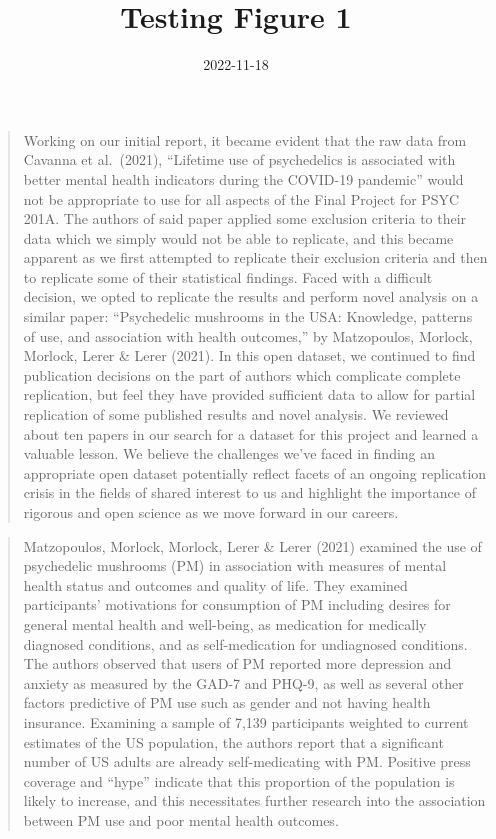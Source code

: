 \documentclass[
]{article}
\title{Testing Figure 1}
\author{}
\date{\vspace{-2.5em}2022-11-18}
\begin{document}
\maketitle

\begin{quote}
Working on our initial report, it became evident that the raw data from
Cavanna et al.~(2021), ``Lifetime use of psychedelics is associated with
better mental health indicators during the COVID-19 pandemic'' would not
be appropriate to use for all aspects of the Final Project for PSYC
201A. The authors of said paper applied some exclusion criteria to their
data which we simply would not be able to replicate, and this became
apparent as we first attempted to replicate their exclusion criteria and
then to replicate some of their statistical findings. Faced with a
difficult decision, we opted to replicate the results and perform novel
analysis on a similar paper: ``Psychedelic mushrooms in the USA:
Knowledge, patterns of use, and association with health outcomes,'' by
Matzopoulos, Morlock, Morlock, Lerer \& Lerer (2021). In this open
dataset, we continued to find publication decisions on the part of
authors which complicate complete replication, but feel they have
provided sufficient data to allow for partial replication of some
published results and novel analysis. We reviewed about ten papers in
our search for a dataset for this project and learned a valuable lesson.
We believe the challenges we've faced in finding an appropriate open
dataset potentially reflect facets of an ongoing replication crisis in
the fields of shared interest to us and highlight the importance of
rigorous and open science as we move forward in our careers.
\end{quote}

\begin{quote}
Matzopoulos, Morlock, Morlock, Lerer \& Lerer (2021) examined the use of
psychedelic mushrooms (PM) in association with measures of mental health
status and outcomes and quality of life. They examined participants'
motivations for consumption of PM including desires for general mental
health and well-being, as medication for medically diagnosed conditions,
and as self-medication for undiagnosed conditions. The authors observed
that users of PM reported more depression and anxiety as measured by the
GAD-7 and PHQ-9, as well as several other factors predictive of PM use
such as gender and not having health insurance. Examining a sample of
7,139 participants weighted to current estimates of the US population,
the authors report that a significant number of US adults are already
self-medicating with PM. Positive press coverage and ``hype'' indicate
that this proportion of the population is likely to increase, and this
necessitates further research into the association between PM use and
poor mental health outcomes.
\end{quote}
\end{document}
